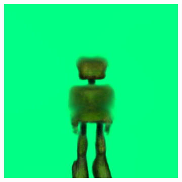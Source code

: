 \begin{figure}[ht]
\begin{subfigure}[b]{0.20\textwidth}
        \includegraphics[width=\textwidth]{etc/a robot made out of plants/dreamfusion/dreamfusion_plantrobot_10000_part1.png}
        \caption{}
    \end{subfigure}
    \hspace{.5cm}
    \begin{subfigure}[b]{0.252\textwidth}
        \centering

\end{subfigure}
\end{figure}
